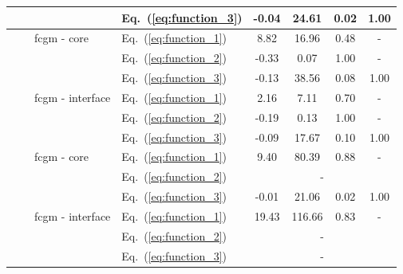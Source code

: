 \begin{table}
\begin{tabular}{ccllcccc}
		& & & Eq.~(\ref{eq:function_3}) & -0.04 & 24.61 & 0.02 & 1.00 \\
		\midrule
		\multirow{12}{*}{\rotatebox[origin=c]{90}{\ac{cc}}} & \multirow{6}{*}{\rotatebox[origin=c]{90}{50 \unit{\kHz}}} & \multirow{3}{*}{\ac{fcgm} - core} & Eq.~(\ref{eq:function_1}) & 8.82 & 16.96 & 0.48 &-\\
		& & & Eq.~(\ref{eq:function_2}) & -0.33 & 0.07 & 1.00 &- \\
		& & & Eq.~(\ref{eq:function_3}) & -0.13 & 38.56 & 0.08 & 1.00 \\
		\cline{3-8}
		& & \multirow{3}{*}{\ac{fcgm} - interface} & Eq.~(\ref{eq:function_1}) & 2.16 & 7.11 & 0.70 &- \\
		& & & Eq.~(\ref{eq:function_2}) & -0.19 & 0.13 & 1.00 & -\\
		& & & Eq.~(\ref{eq:function_3}) & -0.09 & 17.67 & 0.10 & 1.00 \\
		\cline{2-8}
		& \multirow{6}{*}{\rotatebox[origin=c]{90}{100 \unit{\kHz}}} & \multirow{3}{*}{\ac{fcgm} - core} & Eq.~(\ref{eq:function_1}) & 9.40 & 80.39 & 0.88 &-\\
		& & & Eq.~(\ref{eq:function_2}) & \multicolumn{4}{c}{-} \\
		& & & Eq.~(\ref{eq:function_3}) & -0.01 & 21.06 & 0.02 & 1.00\\
		\cline{3-8}
		& & \multirow{3}{*}{\ac{fcgm} - interface} & Eq.~(\ref{eq:function_1}) & 19.43 & 116.66 & 0.83 &-\\
		& & & Eq.~(\ref{eq:function_2}) & \multicolumn{4}{c}{-} \\
		& & & Eq.~(\ref{eq:function_3}) & \multicolumn{4}{c}{-} \\
		\bottomrule
	\end{tabular}
\end{table}

